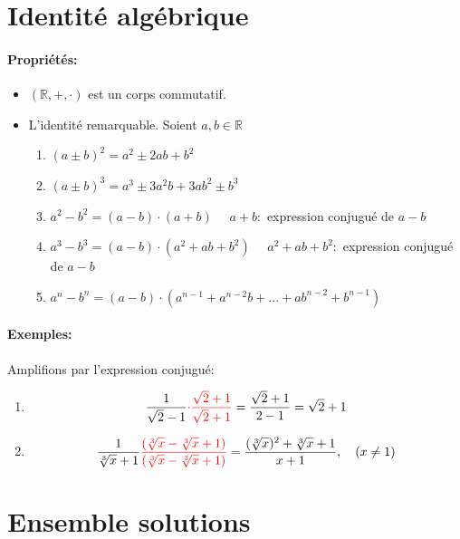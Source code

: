 \documentclass[
    11pt,
    a4paper,
    oneside,
    headinlcude, footinclude,
    twoside,
]{report}
\begin{document}
\section{Identité algébrique}

\paragraph{Propriétés:}
\begin{itemize}
    \item $(\mathbb{R}, +, \cdot)$ est un corps commutatif.
    \item L'identité remarquable. Soient $a, b \in \mathbb{R}$
        \begin{enumerate}
            \item $(a \pm b)^{2} = a^{2} \pm 2ab + b^{2}$ 
            \item $(a \pm b)^{3} = a^{3} \pm 3a^{2}b + 3ab^{2} \pm b^{3}$ 
            \item $a^{2} - b^{2} = (a - b) \cdot (a + b)$ {\color{red} $\quad a+b:$ expression conjugué de $a-b$  }
            \item $a^{3} - b^{3} = (a - b) \cdot (a^{2} + ab + b^{2})$ {\color{red} $\quad a^{2} + ab +b^{2}:$ expression conjugué de $a-b$}
            \item $a ^{n} - b^{n} = (a - b) \cdot (a^{n-1} + a^{n-2}b + ... + ab^{n-2} + b^{n-1})$ 
        \end{enumerate}
\end{itemize}

\paragraph{Exemples:} Amplifions par l'expression conjugué:

\begin{enumerate}
    \item $$\frac{1}{\sqrt{2}-1} {\color{red}\cdot \frac{\sqrt{2} + 1}{\sqrt{2}+1}}
        = \frac{\sqrt{2}+1}{2 - 1} = \sqrt{2}+1$$
    \item $$ \frac{1}{\sqrt[3]{x} + 1} {\color{red} \frac{(\sqrt[3]{x} - 
        \sqrt[3]{x} + 1)}{(\sqrt[3]{x} - \sqrt[3]{x} + 1)}} =
        \frac{(\sqrt[3]{x})^{2} + \sqrt[3]{x} + 1}{x + 1}, \quad (x \neq 1)$$
\end{enumerate}

\section{Ensemble solutions}
\label{sec:ensemble_solutions}
\end{document}

